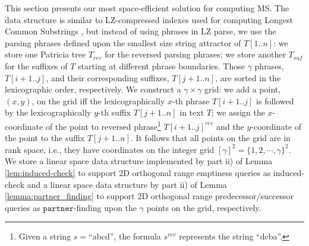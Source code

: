 \documentclass[smallabstract,smallcaptions]{dccpaper}
\newtheorem{lemma}{Lemma}
\def\idtt#1{\ensuremath{\mathtt{#1}}}
\def\occ{\idtt{occ}}
\def\partner{\idtt{partner}}
\begin{document}
	
	This section presents our most space-efficient solution for computing MS.
	The data structure is similar to LZ-compressed indexes used for computing Longest Common Substrings \cite{gagie2013heaviest}, but instead of using phrases in LZ parse, we use the parsing phrases defined upon the smallest size string attractor of $T[1..n]$: we store one Patricia tree $T_{rev}$ for the reversed parsing phrases; we store another $T_{suf}$ for the suffixes of $T$ starting at different phrase boundaries.
	Those $\gamma$ phrases, $T[i+1.. j]$, and their corresponding suffixes, $T[j+1.. n]$, are sorted in the lexicographic order, respectively.
	We construct a $\gamma \times \gamma$ grid: we add a point, $(x, y)$, on the grid iff the lexicographically $x$-th phrase $T[i+1.. j]$ is followed by the lexicographically $y$-th suffix $T[j+1..n]$ in text $T$; we assign the $x$-coordinate of the point to reversed phrase\footnote{Given a string $s=$``abcd'', the formula $s^{rev}$ represents the string ``dcba''.} $T[i+1..j]^{rev}$ and the $y$-coordinate of the point to the suffix $T[j+1..n]$.
	It follows that all points on the grid are in rank space, i.e.,  they have coordinates on the integer grid $[\gamma]^2=\{1, 2,\cdots, \gamma\}^2$.
	We store a linear space data structure implemented by part ii) of Lemma \ref{lem:induced-check} to support 2D orthogonal range emptiness queries as induced-check and a linear space data structure by part ii) of Lemma \ref{lemma:partner_finding} to support 2D orthogonal range predecessor/successor queries as $\partner$-finding upon the $\gamma$ points on the grid, respectively.
\end{document}
